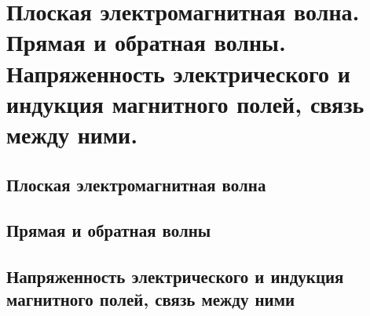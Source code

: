 \chapter{Плоская электромагнитная волна. Прямая и обратная волны. 
Напряженность электрического и индукция магнитного полей, связь между 
ними.}

\section{Плоская электромагнитная волна}
\section{Прямая и обратная волны}
\section{Напряженность электрического и индукция магнитного полей, связь 
между ними}
